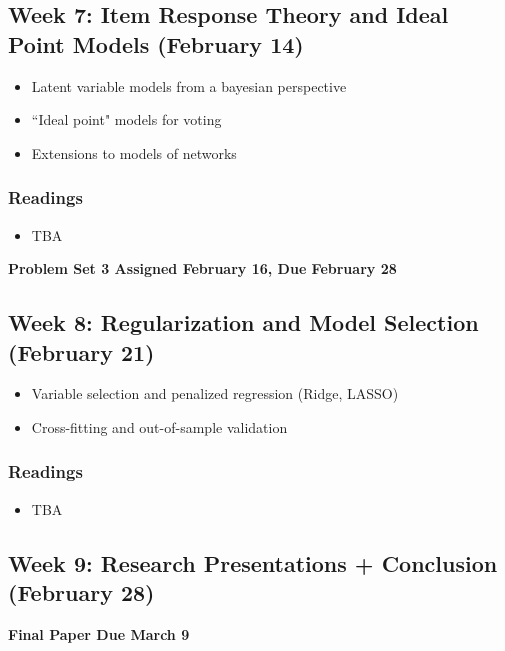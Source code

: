 \documentclass[11pt, article, oneside]{memoir}
\theoremstyle{Assumption}
\begin{document}
\subsection{Week 7: Item Response Theory and Ideal Point Models (February 14)}

\begin{itemize}
\item Latent variable models from a bayesian perspective
\item ``Ideal point" models for voting
\item Extensions to models of networks 
\end{itemize}

\subsubsection*{Readings}

\begin{itemize}
\item TBA
\end{itemize}

\textbf{Problem Set 3 Assigned February 16, Due February 28}

\subsection{Week 8: Regularization and Model Selection (February 21)}

\begin{itemize}
\item Variable selection and penalized regression (Ridge, LASSO) 
\item Cross-fitting and out-of-sample validation
\end{itemize}

\subsubsection*{Readings}

\begin{itemize}
\item TBA
\end{itemize}

\subsection{Week 9: Research Presentations + Conclusion (February 28)}

\textbf{Final Paper Due March 9}
\end{document}
